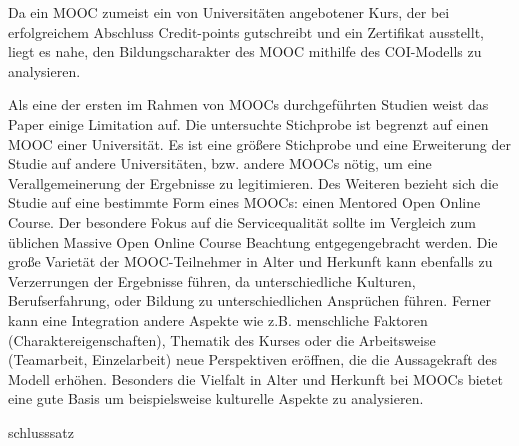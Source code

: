Da ein MOOC zumeist ein von Universitäten angebotener Kurs, der bei erfolgreichem Abschluss Credit-points gutschreibt und ein Zertifikat ausstellt, liegt es nahe, den Bildungscharakter des MOOC mithilfe des COI-Modells zu analysieren.     

\par

Als eine der ersten im Rahmen von MOOCs durchgeführten Studien weist das Paper einige Limitation auf. Die untersuchte Stichprobe ist begrenzt auf einen MOOC einer Universität. Es ist eine größere Stichprobe und eine Erweiterung der Studie auf andere Universitäten, bzw. andere MOOCs nötig, um eine Verallgemeinerung der Ergebnisse zu legitimieren. Des Weiteren bezieht sich die Studie auf eine bestimmte Form eines MOOCs: einen Mentored Open Online Course. Der besondere Fokus auf die Servicequalität sollte im Vergleich zum üblichen Massive Open Online Course Beachtung entgegengebracht werden. Die große Varietät der MOOC-Teilnehmer in Alter und Herkunft kann ebenfalls zu Verzerrungen der Ergebnisse führen, da unterschiedliche Kulturen, Berufserfahrung, oder Bildung zu unterschiedlichen Ansprüchen führen. 
Ferner kann eine Integration andere Aspekte wie z.B. menschliche Faktoren (Charaktereigenschaften), Thematik des Kurses oder die Arbeitsweise (Teamarbeit, Einzelarbeit) neue Perspektiven eröffnen, die die Aussagekraft des Modell erhöhen. Besonders die Vielfalt in Alter und Herkunft bei MOOCs bietet eine gute Basis um beispielsweise kulturelle Aspekte zu analysieren.  

schlusssatz




